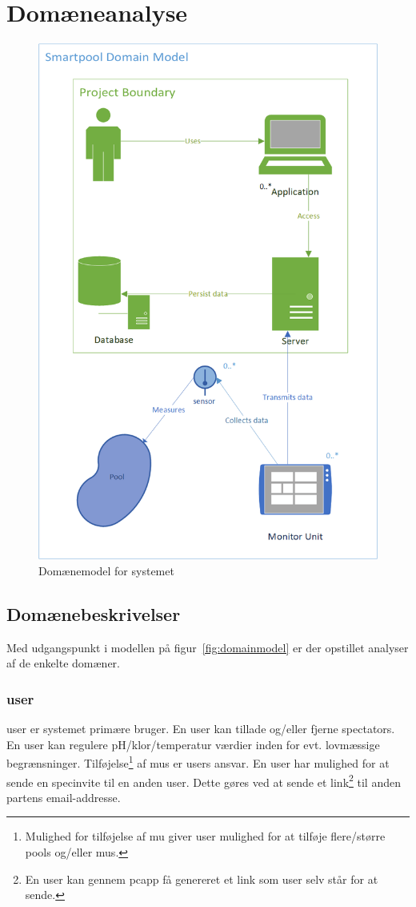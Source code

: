 \section{Domæneanalyse}

\begin{figure}
	\centering
	\includegraphics[width=0.7\linewidth]{figs/ProjectBoundary}
	\caption{Domænemodel for systemet}
	\label{fig:domainmodelboundary}
\end{figure}


\subsection{Domænebeskrivelser}
Med udgangspunkt i modellen på figur~\ref{fig:domainmodel} er der opstillet analyser af de enkelte domæner.

\subsubsection{\gls{user}}
\gls{user} er systemet primære bruger. En \gls{user} kan tillade og/eller fjerne \glspl{spectator}. En \gls{user} kan regulere pH/klor/temperatur værdier inden for evt. lovmæssige begrænsninger. Tilføjelse\footnote{Mulighed for tilføjelse af  \gls{mu} giver \gls{user} mulighed for at tilføje flere/større \glspl{pool} og/eller \glspl{mu}.} af \glspl{mu} er \glspl{user} ansvar. En \gls{user} har mulighed for at sende en \gls{specinvite} til en anden \gls{user}. Dette gøres ved at sende et link\footnote{En \gls{user} kan gennem \gls{pcapp} få genereret et link som \gls{user} selv står for at sende.}  til anden partens email-addresse.

